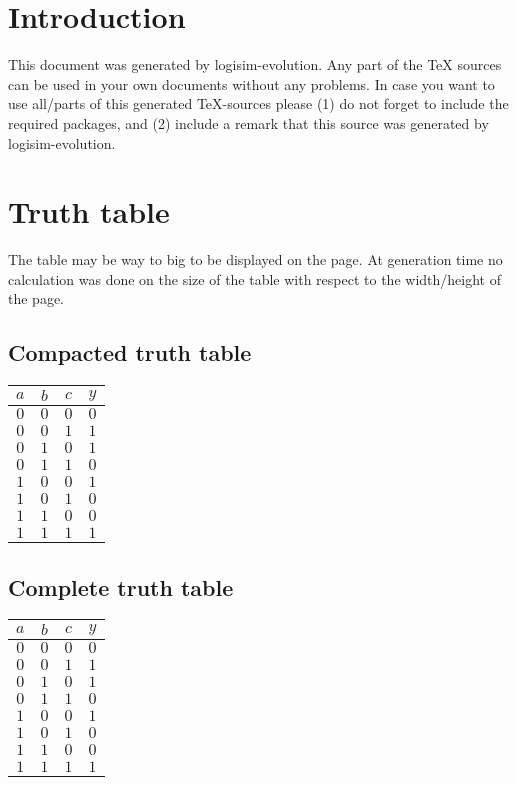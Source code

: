 \documentclass [15pt,a4paper,twoside]{article}
\begin{document}
\section{Introduction}
This document was generated by logisim-evolution. Any part of the TeX sources can be used in your own documents without any problems. In case you want to use all/parts of this generated TeX-sources please (1) do not forget to include the required packages, and (2) include a remark that this source was generated by logisim-evolution.
\section{Truth table}
The table may be way to big to be displayed on the page. At generation time no calculation was done on the size of the table with respect to the width/height of the page.
\subsection{Compacted truth table}
\begin{center}
\begin{tabular}{ccc|c}
$a$&$b$&$c$&$y$\\
\hline
$0$&$0$&$0$&$0$\\
$0$&$0$&$1$&$1$\\
$0$&$1$&$0$&$1$\\
$0$&$1$&$1$&$0$\\
$1$&$0$&$0$&$1$\\
$1$&$0$&$1$&$0$\\
$1$&$1$&$0$&$0$\\
$1$&$1$&$1$&$1$\\

\end{tabular}
\end{center}
\subsection{Complete truth table}
\begin{center}
\begin{tabular}{ccc|c}
$a$&$b$&$c$&$y$\\
\hline
$0$&$0$&$0$&$0$\\
$0$&$0$&$1$&$1$\\
$0$&$1$&$0$&$1$\\
$0$&$1$&$1$&$0$\\
$1$&$0$&$0$&$1$\\
$1$&$0$&$1$&$0$\\
$1$&$1$&$0$&$0$\\
$1$&$1$&$1$&$1$\\

\end{tabular}
\end{center}
\end{document}
